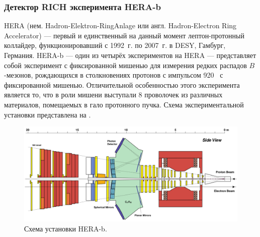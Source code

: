 
\subsubsection{Детектор RICH эксперимента HERA-b}\label{sec:HerabRich}



HERA (нем. Hadron-Elektron-RingAnlage или англ. Hadron-Electron Ring Accelerator) --- первый и единственный на данный момент лептон-протонный коллайдер, функционировавший с 1992~г. по 2007~г. в DESY, Гамбург, Германия. HERA-b --- один из четырёх экспериментов на HERA --- представляет собой эксперимент с фиксированной мишенью для измерения редких распадов $B$-мезонов, рождающихся в столкновениях протонов с импульсом 920~\GeVoverC{} с фиксированной мишенью. Отличительной особенностью этого эксперимента является то, что в роли мишени выступали 8 проволочек из различных материалов, помещаемых в гало протонного пучка. Схема экспериментальной установки представлена на .



\begin{figure}[H]
\centering
\includegraphics[width=1.0\textwidth]{pictures/HERA_b_setup.png}
\caption{Схема установки HERA-b.}
\label{fig:HERAbSetup}
\end{figure}

